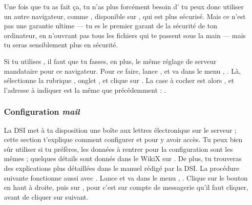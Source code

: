 Une fois que tu as fait \c{c}a, tu n'as plus forcément besoin d' tu peux donc utiliser un autre navigateur, comme , disponible sur \xshare, qui est plus sécurisé. Mais ce n'est pas une garantie ultime --- tu es le premier garant de la sécurité de ton
ordinateur, en n'ouvrant pas tous les fichiers qui te passent sous la main
--- mais tu seras sensiblement plus en sécurité.


Si tu utilises , il faut que tu fasses, en plus, le même réglage de serveur mandataire pour
ce navigateur. Pour ce faire, lance , et va dans le menu ,
. Là, sélectionne la rubrique , onglet , et clique sur
. La case à cocher est alors ,
et l'adresse à indiquer est la même que précédemment : .





\subsubsection{Configuration \emph{mail}}

La DSI met à ta disposition une bo\^{i}te aux lettres électronique sur
le serveur  ; cette section t'explique comment
configurer  et  pour y avoir accès. Tu peux bien
s\^{u}r utiliser  si tu préfères, les données à rentrer
pour la configuration sont les mêmes ; quelques détails sont donnés
dans le WikiX sur \fkz. De plus, tu trouveras des explications plus
détaillées dans le manuel rédigé par la DSI.
La procédure suivante fonctionne aussi avec .
Lance  et va dans le menu ,
. Clique sur le bouton  en
haut à droite, puis sur , pour  c'est sur compte de messagerie qu'il faut cliquer, avant de cliquer sur suivant.



